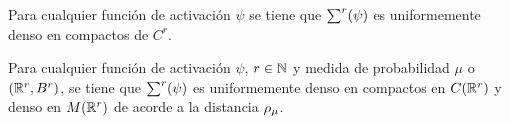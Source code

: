 \begin{lema}
    Para cualquier función de activación $\psi$ se tiene que 
    $\sum^r (\psi)$ es uniformemente denso en compactos de $C^r.$
\end{lema}

\begin{teorema}
    Para cualquier función de activación $\psi$, $r \in \mathbb{N}$ y
    medida de probabilidad $\mu$ o $(\mathbb{R}^r, B^r)$, 
    se tiene que $\sum^r (\psi)$ es uniformemente denso en compactos
    en $C(\mathbb{R}^r)$ y denso en $M(\mathbb{R}^r)$ de acorde a la distancia $\rho_{\mu}$. 
\end{teorema}
